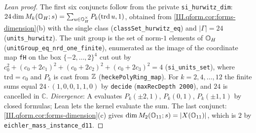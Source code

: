 \begin{proof}[Lean proof]
The first six conjuncts follow from the private \texttt{si\_hurwitz\_dim}: $24\dim M_k(\mathbb{O}_H;s)=\sum_{u\in\mathbb{O}_H^\times}P_k(\mathrm{trd}\,u,1)$, obtained from \cref{III.qform.cor:forms-dimension}(b) with the single class (\texttt{classSet\_hurwitz\_eq}) and $|\Gamma|=24$ (\texttt{units\_hurwitz}). The unit group is the set of norm-$1$ elements of $\mathbb{O}_H$ (\texttt{unitGroup\_eq\_nrd\_one\_finite}), enumerated as the image of the coordinate map \texttt{fH} on the box $\{-2,\dots,2\}^4$ cut out by $c_0^2+(c_0+2c_1)^2+(c_0+2c_2)^2+(c_0+2c_3)^2=4$ (\texttt{si\_units\_set}), where $\mathrm{trd}=c_0$ and $P_k$ is cast from $\mathbb{Z}$ (\texttt{heckePolyRing\_map}). For $k=2,4,\dots,12$ the finite sums equal $24\cdot(1,0,0,1,1,0)$ by \texttt{decide} (\texttt{maxRecDepth 2000}), and $24$ is cancelled in $\mathbb C$. \emph{Divergence}: A evaluates $P_k(\pm2,1)$, $P_k(0,1)$, $P_k(\pm1,1)$ by closed formulas; Lean lets the kernel evaluate the sum. The last conjunct: \cref{III.qform.cor:forms-dimension}(c) gives $\dim M_2(\mathbb{O}_{11};s)=|X(\mathbb{O}_{11})|$, which is $2$ by \texttt{eichler\_mass\_instance\_d11}.
\end{proof}

